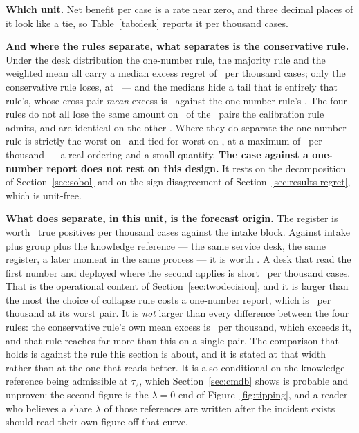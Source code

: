 \textbf{Which unit.} Net benefit per case is a rate near zero, and three
decimal places of it look like a tie, so Table~\ref{tab:desk} reports it per
thousand cases.

\textbf{And where the rules separate, what separates is the conservative
rule.} Under the desk distribution the
one-number rule, the majority rule and the weighted mean all carry a median
excess regret of \excessOneNumberDesk\ per thousand cases; only the
conservative rule loses, at \excessUniformDesk\ --- and the medians hide a
tail that is entirely that rule's, whose cross-pair \emph{mean} excess is
\meanExcessUniformDesk\ against the one-number rule's
\meanExcessOneNumberDesk. The four rules do not all lose the same amount on
\nSeparatingDesk\ of the \nPairsDesk\ pairs the calibration rule admits, and
are identical on the other \nAllRulesTieDesk. Where they do separate the
one-number rule is strictly the worst on \nOneNumberWorstDesk\ and tied for
worst on \nOneNumberTiedWorstDesk, at a maximum of
\maxExcessOneNumberDesk\ per thousand --- a real ordering and a small
quantity. \textbf{The case against a one-number report does not rest on this
design.} It rests on the decomposition of Section~\ref{sec:sobol} and on the
sign disagreement of Section~\ref{sec:results-regret}, which is unit-free.

\textbf{What does separate, in this unit, is the forecast origin.} The register
is worth \promisedPerThousand\ true positives per thousand cases against the
intake block. Against intake plus group plus the knowledge reference --- the
same service desk, the same register, a later moment in the same process --- it is
worth \deliveredPerThousand. A desk that read the first number and deployed
where the second applies is short \shortfallPerThousand\ per thousand cases.
That is the operational content of Section~\ref{sec:twodecision}, and it is
larger than the most the choice of collapse rule costs a one-number report,
which is \maxExcessOneNumberDesk\ per thousand at its worst pair. It is
\emph{not} larger than every difference between the four rules: the
conservative rule's own mean excess is \meanExcessUniformDesk\ per thousand,
which exceeds it, and that rule reaches far more than this on a single pair.
The comparison that holds is against the rule this section is about, and it is
stated at that width rather than at the one that reads better.
It is also conditional on the knowledge reference being admissible at
$\tau_2$, which Section~\ref{sec:cmdb} shows is probable and unproven: the
second figure is the $\lambda = 0$ end of Figure~\ref{fig:tipping}, and a reader
who believes a share $\lambda$ of those references are written after the incident
exists should read their own figure off that curve.

